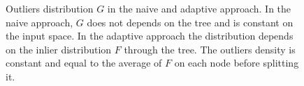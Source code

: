 \begin{figure}[!ht]
  \caption{\small Outliers distribution $G$ in the naive and adaptive approach.  In the naive approach, $G$ does not depends on the tree and is constant on the input space. In the adaptive approach the distribution depends on the inlier distribution $F$ through the tree. The outliers density is constant and equal to the average of $F$ on each node before splitting it.
}
  \label{ocrf:fig:outlier_density}
\end{figure}



